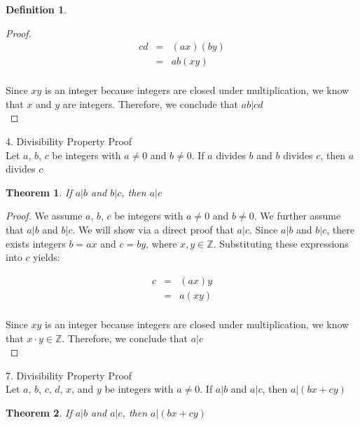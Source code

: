 \documentclass{book}
\newtheorem{theorem}{Theorem}[section]
\theoremstyle{definition}
\newtheorem{definition}{Definition}[section]
\theoremstyle{remark}
\newcommand{\bb}[1]{\mathbb{#1}}
\newcommand{\m}{\cdot}
\begin{document}
\begin{definition}
\begin{proof}
\begin{eqnarray*}
	cd & = & (ax)(by) \nonumber \\	
	& = & ab(xy) \nonumber \\
\end{eqnarray*}

Since $xy$ is an integer because integers are closed under multiplication, we know that $x$ and $y$ are integers. Therefore, we conclude that $ab | cd$ \\
\end{proof}


4. Divisibility Property Proof \\

Let $a$, $b$, $c$ be integers with $a \neq 0$ and $b\neq 0$. If $a$ divides $b$ and $b$ divides $c$, then $a$ divides $c$

\begin{tcolorbox}
	\begin{theorem}
		If $a | b$ and $b | c$, then $a | c$
	\end{theorem}
\end{tcolorbox}

\begin{proof}
We assume $a$, $b$, $c$ be integers with $a \neq 0$ and $b\neq 0$. We further assume that $a | b$ and $b | c$. We will show via a direct proof that $a | c$. Since $a | b$ and $b | c$, there exists integers $b = ax$ and $c = by$, where $x, y \in \bb{Z}$. Substituting these expressions into $c$ yields:

\begin{eqnarray*}	
	c & = & (ax)y \nonumber \\
	& = & a(xy) \nonumber \\
\end{eqnarray*}

Since $xy$ is an integer because integers are closed under multiplication, we know that $x \m y \in \bb{Z}$. Therefore, we conclude that $a | c$ \\
\end{proof}



7. Divisibility Property Proof \\

Let $a$, $b$, $c$, $d$, $x$, and $y$ be integers with $a \neq 0$. If $a | b$ and $a | c$, then $a | (bx + cy)$ \\

\begin{tcolorbox}
	\begin{theorem}
		If $a | b$ and $a | c$, then $a |(bx + cy)$
	\end{theorem}
\end{tcolorbox}


\end{definition}
\end{document}
